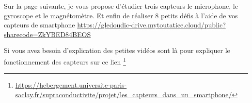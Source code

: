 \documentclass[french, a4paper, 12pt]{article}
\begin{document}
	Sur la page suivante, je vous propose d'étudier trois capteurs le microphone, le gyroscope et le magnétomètre. Et enfin de réaliser 8 petits défis à l'aide de vos capteurs de smartphone \url{https://gledoudic-drive.mytoutatice.cloud/public?sharecode=ZkYBED84BEOS}\medskip

	Si vous avez besoin d'explication des petites vidéos sont là pour expliquer le fonctionnement des capteurs sur ce lien \footnote{\url{https://hebergement.universite-paris-saclay.fr/supraconductivite/projet/les_capteurs_dans_un_smartphone/}}
	
\clearpage



\end{document}
